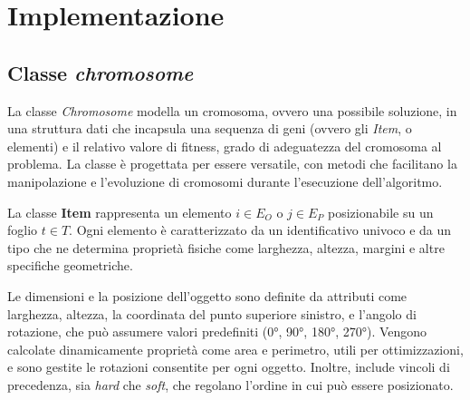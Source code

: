 \chapter{Implementazione} \hypertarget{cleancode}{} \hypertarget{chiara2}{}
\label{cap:progettazione-codifica}



\section{Classe \emph{chromosome}}

La classe \emph{Chromosome} modella un cromosoma, ovvero una possibile soluzione, in una struttura dati che incapsula una sequenza di geni (ovvero gli \emph{Item}, o elementi) e il relativo valore di fitness, grado di adeguatezza del cromosoma al problema. La classe è progettata per essere versatile, con metodi che facilitano la manipolazione e l'evoluzione di cromosomi durante l'esecuzione dell'algoritmo.

La classe \textbf{Item} rappresenta un elemento \( i \in E_O\) o \( j \in E_P\) posizionabile su un foglio \( t \in T \). Ogni elemento è caratterizzato da un identificativo univoco e da un tipo che ne determina proprietà fisiche come larghezza, altezza, margini e altre specifiche geometriche.

Le dimensioni e la posizione dell'oggetto sono definite da attributi come larghezza, altezza, la coordinata del punto superiore sinistro, e l'angolo di rotazione, che può assumere valori predefiniti (0°, 90°, 180°, 270°). Vengono calcolate dinamicamente proprietà come area e perimetro, utili per ottimizzazioni, e sono gestite le rotazioni consentite per ogni oggetto. Inoltre, include vincoli di precedenza, sia \emph{hard} che \emph{soft}, che regolano l'ordine in cui può essere posizionato.


